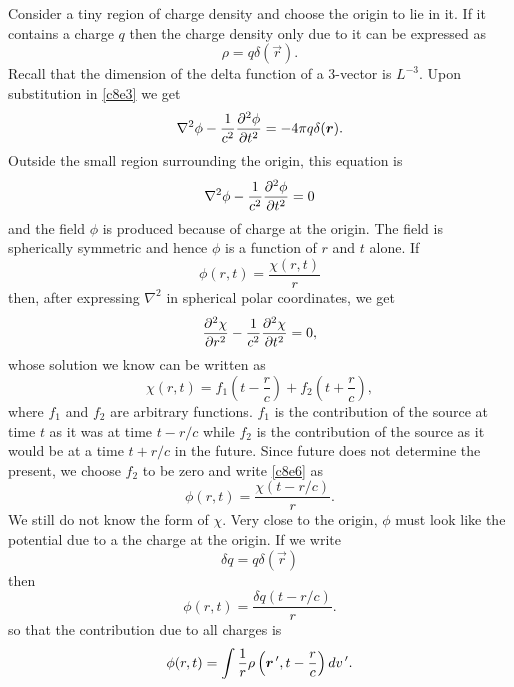 \begin{enumerate}
Consider a tiny region of charge density and choose the origin to lie in it. If
it contains a charge $q$ then the charge density only due to it can be expressed
as 
\begin{equation}\label{c8e5}
\rho = q\delta(\vec{r}).
\end{equation}
Recall that the dimension of the delta function of a 3-vector is $L^{-3}$. Upon
substitution in \eqref{c8e3} we get
\[
\nabla^2\phi - \frac{1}{c^2}\frac{\partial^2{\phi}}{\partial{t}^2} = -4\pi q\delta(\bm{r}).
\]
Outside the small region surrounding the origin, this equation is 
\[
\nabla^2\phi - \frac{1}{c^2}\frac{\partial^2{\phi}}{\partial{t}^2} = 0
\]
and the field $\phi$ is produced because of charge at the origin. The field is
spherically symmetric and hence $\phi$ is a function of $r$ and $t$ alone. If
\begin{equation}\label{c8e6}
\phi(r, t) = \frac{\chi(r, t)}{r}
\end{equation}
then, after expressing $\nabla^2$ in spherical polar coordinates, we get
\begin{equation}\label{c8e7}
\frac{\partial^2{\chi}}{\partial{r}^2} - \frac{1}{c^2}\frac{\partial^2{\chi}}{\partial{t}^2} = 0,
\end{equation}
whose solution we know can be written as
\begin{equation}\label{c8e8}
\chi(r, t) = f_1\left(t - \frac{r}{c}\right) + f_2\left(t + \frac{r}{c}\right),
\end{equation}
where $f_1$ and $f_2$ are arbitrary functions. $f_1$ is the contribution of the
source at time $t$ as it was at time $t - r/c$ while $f_2$ is the contribution
of the source as it would be at a time $t + r/c$ in the future. Since future 
does not determine the present, we choose $f_2$ to be zero and write 
\eqref{c8e6} as 
\begin{equation}\label{c8e9}
\phi(r, t) = \frac{\chi(t - r/c)}{r}.
\end{equation}
We still do not know the form of $\chi$. Very close to the origin, $\phi$ must
look like the potential due to a the charge at the origin. If we write 
\begin{equation}\label{c8e10}
\delta q = q\delta(\vec{r})
\end{equation}
then
\begin{equation}\label{c8e11}
\phi(r, t) = \frac{\delta q (t - r/c)}{r}.
\end{equation}
so that the contribution due to all charges is
\begin{equation}\label{c8e12}
\phi(r, t)=\int \frac{1}{r}\rho\left(\bm{r}^{\,\prime}, t - \frac{r}{c}\right)dv^{\,\prime}.
\end{equation}

\end{enumerate}
